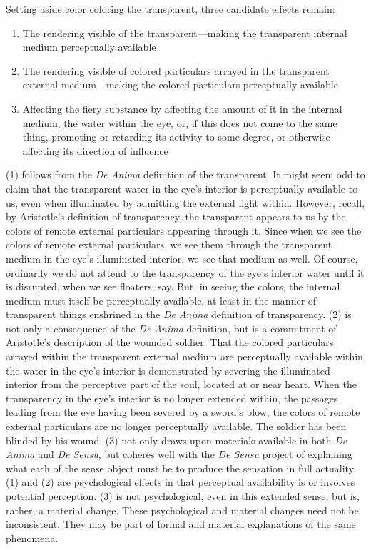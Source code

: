 Setting aside color coloring the transparent, three candidate effects remain:
\begin{enumerate}[(1)]
	\item The rendering visible of the transparent---making the transparent internal me\-di\-um perceptually available
	\item The rendering visible of colored particulars arrayed in the transparent external me\-di\-um\----making the colored particulars perceptually available
	\item Affecting the fiery substance by affecting the amount of it in the internal me\-di\-um, the water within the eye, or, if this does not come to the same thing, promoting or retarding its activity to some degree, or otherwise affecting its direction of influence
\end{enumerate}
(1) follows from the \emph{De Anima} definition of the transparent. It might seem odd to claim that the transparent water in the eye's interior is perceptually available to us, even when illuminated by admitting the external light within. However, recall, by Aristotle's definition of transparency, the transparent appears to us by the colors of remote external particulars appearing through it. Since when we see the colors of remote external particulars, we see them through the transparent medium in the eye's illuminated interior, we see that medium as well. Of course, ordinarily we do not attend to the transparency of the eye's interior water until it is disrupted, when we see floaters, say. But, in seeing the colors, the internal medium must itself be perceptually available, at least in the manner of transparent things enshrined in the \emph{De Anima} definition of transparency. (2) is not only a consequence of the \emph{De Anima} definition, but is a commitment of Aristotle's description of the wounded soldier. That the colored particulars arrayed within the transparent external medium are perceptually available within the water in the eye's interior is demonstrated by severing the illuminated interior from the perceptive part of the soul, located at or near heart. When the transparency in the eye's interior is no longer extended within, the passages leading from the eye having been severed by a sword's blow, the colors of remote external particulars are no longer perceptually available. The soldier has been blinded by his wound. (3) not only draws upon materials available in both \emph{De Anima} and \emph{De Sensu}, but coheres well with the \emph{De Sensu} project of explaining what each of the sense object must be to produce the sensation in full actuality. (1) and (2) are psychological effects in that perceptual availability is or involves potential perception. (3) is not psychological, even in this extended sense, but is, rather, a material change. These psychological and material changes need not be inconsistent. They may be part of formal and material explanations of the same phenomena. 

